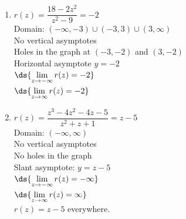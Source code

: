 \documentclass{ximera}
\begin{document}
\begin{multicols}{2}
\begin{enumerate}
\setcounter{enumi}{\value{HW}}

\item $r(z) = \dfrac{18-2z^2}{z^2-9} = -2$\\
Domain: $(-\infty, -3) \cup (-3,3) \cup (3, \infty)$\\
No vertical asymptotes \\
Holes in the graph at $(-3,-2)$ and $(3,-2)$ \\
Horizontal asymptote $y = -2$ \\
$\ds{\lim_{z \rightarrow   - \infty} r(z)  = -2}$ \\
$\ds{\lim_{z \rightarrow    \infty} r(z)  = -2}$ \\

\vfill
\columnbreak

\item $r(z) = \dfrac{z^3-4z^2-4z-5}{z^2+z+1} = z-5$\\
Domain: $(-\infty, \infty)$\\
No vertical asymptotes \\
No holes in the graph \\
Slant asymptote:  $y = z-5$ \\
$\ds{\lim_{z \rightarrow -\infty} r(z) = -\infty}$\\
$\ds{\lim_{z \rightarrow \infty} r(z) = \infty}$\\
$r(z) = z-5$ everywhere. \\
\setcounter{HW}{\value{enumi}}
\end{enumerate}
\end{multicols}
\end{document}

